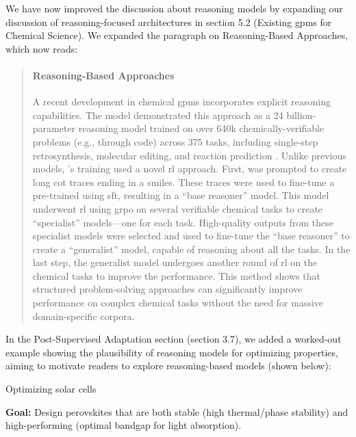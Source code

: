 \begin{reply}
We have now improved the discussion about reasoning models by expanding our discussion of reasoning-focused architectures in section 5.2 (Existing \glspl{gpm} for Chemical Science). 
We expanded the paragraph on Reasoning-Based Approaches, which now reads:

\begin{quote}
    
\paragraph{Reasoning-Based Approaches} A recent development in chemical \glspl{gpm} incorporates explicit reasoning capabilities. The  model demonstrated this approach as a 24 billion-parameter reasoning model trained on over 640k chemically-verifiable problems (e.g., through code) across 375 tasks, including single-step retrosynthesis, molecular editing, and reaction prediction \autocite{narayanan2025training}. 
Unlike previous models, 's training used a novel \gls{rl} approach. First,  was prompted to create long \gls{cot} traces ending in a \gls{smiles}. These traces were used to fine-tune a pre-trained  using \gls{sft}, resulting in a \enquote{base reasoner} model. This model underwent \gls{rl} using \gls{grpo} on several verifiable chemical tasks to create \enquote{specialist} models---one for each task. High-quality outputs from these specialist models were selected and used to fine-tune the \enquote{base reasoner} to create a \enquote{generalist} model, capable of reasoning about all the tasks. In the last step, the generalist model undergoes another round of \gls{rl} on the chemical tasks to improve the performance. This method shows that structured problem-solving approaches can significantly improve performance on complex chemical tasks without the need for massive domain-specific corpora. 
\end{quote}

In the Post-Supervised Adaptation section (section 3.7), we added a worked-out example showing the plausibility of reasoning models for optimizing properties, aiming to motivate readers to explore reasoning-based models (shown below):

\begin{examplebox}[label={example:rl}]{Optimizing solar cells}

\textbf{Goal:} Design perovskites that are both stable (high thermal/phase stability) and high-performing (optimal bandgap for light absorption).


\end{examplebox}
\end{reply}
